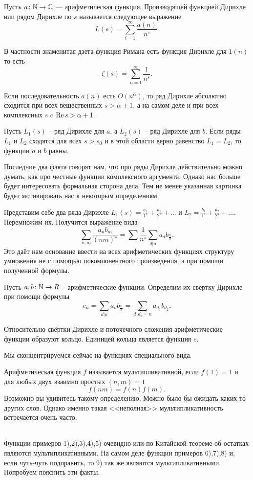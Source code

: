 \dfn Пусть $a\colon \mathbb{N}\to \mathbb{C}$ --- арифметическая функция. Производящей функцией Дирихле или рядом Дирихле по $s$ называется следующее выражение
$$L(s)=\sum_{i=1}^{\infty} \frac{a(n)}{n^s}.$$ 
\edfn

\dfn В частности знаменитая дзета-функция Римана есть функция Дирихле для $1(n)$ то есть
$$\zeta(s)=\sum_{n=1}^{\infty}\frac{1}{n^s}.$$
\edfn

\rm Если последовательность $a(n)$ есть $O(n^{\alpha})$, то ряд Дирихле абсолютно сходится при всех вещественных $s>\alpha+1$, а на самом деле и при всех комплексных $s$ c $\operatorname{Re} s>\alpha+1$.
\erm

\fct Пусть $L_1(s)$ -- ряд Дирихле для $a$, а $L_2(s)$ -- ряд Дирихле для $b$. Если ряды $L_1$ и $L_2$ сходятся для всех $s>s_0$ и в этой области верно равенство $L_1=L_2$, то функции $a$ и $b$ равны.
\efct

Последние два факта говорят нам, что про ряды Дирихле действительно можно думать, как про честные функции комплексного аргумента. Однако нас больше будет интересовать формальная сторона дела. Тем не менее указанная картинка будет мотивировать нас к некоторым определениям.

Представим себе два ряда Дирихле $L_1(s)=\frac{a_1}{1^s}+\frac{a_2}{2^s}+\dots$ и $L_2=\frac{b_1}{1^s}+\frac{b_2}{2^s}+\dots$. Перемножим их. Получится выражение вида 
$$\sum_{n,m} \frac{a_nb_m}{(nm)^s}=\sum \frac{1}{n^s}\sum_{d|n}a_db_{\frac{n}{d}}.$$
Это даёт нам основание ввести на всех арифметических функциях структуру умножения не с помощью покомпонентного произведения, а при помощи полученной формулы.

 Пусть $a,b\colon \mathbb{N} \to R$ -- арифметические функции. Определим их свёртку Дирихле при помощи формулы $$c_n=\sum_{d|n}a_db_{\frac{n}{d}}=\sum_{d_1d_2=n}a_{d_1}b_{d_2}.$$
\edfn

\lm Относительно свёртки Дирихле и поточечного сложения арифметические функции образуют кольцо. Единицей кольца является функция $e$.
\elm

Мы сконцентрируемся сейчас на функциях специального вида.

\dfn Арифметическая функция $f$ называется мультипликативной, если $f(1)=1$ и для любых двух взаимно простых $(n,m)=1$ 
$$f(nm)=f(n)f(m).$$ 
\edfn
Возможно вы удивитесь такому определению. Можно было бы ожидать каких-то других слов. Однако именно такая <<неполная>> мультипликативность встречается очень часто.

\exm\\
Функции примеров 1),2),3),4),5) очевидно или по Китайской теореме об остатках являются мультипликативными. На самом деле функции примеров 6),7),8) и, если чуть-чуть подправить, то 9) так же являются мультипликативными. Попробуем пояснить эти факты.

